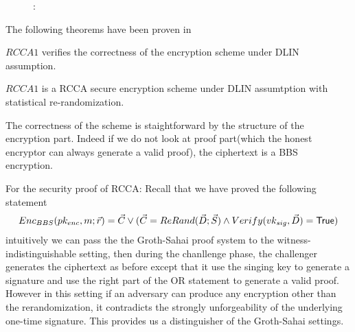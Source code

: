 \begin{description}
\item[]:
  

\end{description}

The following theorems have been proven in~\cite{DBLP:conf/eurocrypt/ChaseKLM12}

\begin{myTh}
  $RCCA1$ verifies the correctness of the encryption scheme under DLIN assumption.
\end{myTh}

\begin{myTh}
  $RCCA1$ is a RCCA secure encryption scheme under DLIN assumtption with statistical re-randomization.
\end{myTh}


The correctness of the scheme is staightforward by the structure of the encryption part. Indeed if we do not look at proof part(which the honest encryptor can always generate a valid proof), the ciphertext is a BBS~\cite{DBLP:conf/crypto/BonehBS04} encryption.

For the security proof of RCCA:
Recall that we have proved the following statement
\begin{align*} 
  Enc_{BBS}(pk_{enc}, m; \vec{r}) = \vec{C} \vee (\vec{C} = ReRand(\vec{D}; \vec{S}) \wedge Verify(vk_{sig}, \vec{D}) = \mathsf{True})
\end{align*}
intuitively we can pass the the Groth-Sahai proof system to the witness-indistinguishable setting, then during the chanllenge phase,
the challenger generates the ciphertext as before except that it use the singing key to generate a signature and use the right part of the OR statement to generate a valid proof.
However in this setting if an adversary can produce any encryption other than the rerandomization, it contradicts the strongly unforgeability of the underlying one-time signature.
This provides us a distinguisher of the Groth-Sahai settings.
%
